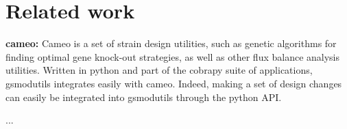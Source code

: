 \documentclass{bioinfo}
\begin{document}
% 
% 
% 
% 
% 
% 

\section{Related work}

\textbf{cameo:} Cameo \cite{cardoso2017cameo} is a set of strain design utilities, such as genetic algorithms for finding optimal gene knock-out
strategies, as well as other flux balance analysis utilities. Written in python and part of the cobrapy suite of applications,
gsmodutils integrates easily with cameo.
Indeed, making a set of design changes can easily be integrated into gsmodutils through the python API.

...
\end{document}
